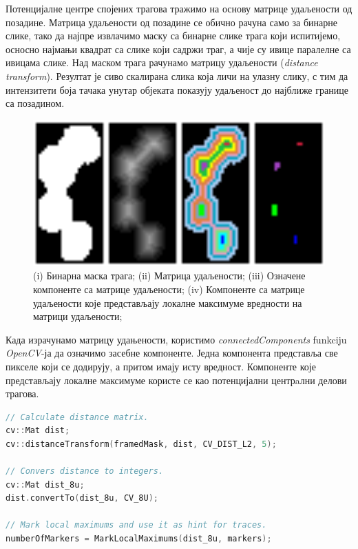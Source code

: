 \documentclass[12pt,a4paper,serbian,oneside]{book}
\begin{document}
Потенцијалне центре спојених трагова тражимо на основу матрице удаљености од позадине. Матрица удаљености од позадине се обично рачуна само за бинарне слике, тако да  најпре извлачимо маску са бинарне слике трага који испитијемо, осносно најмањи квадрат са слике који садржи траг, а чије су ивице паралелне са ивицама слике. Над маском трага рачунамо матрицу удаљености (\textit{distance transform}). Резултат је сиво скалирана слика која личи на улазну слику, с тим да интензитети боја тачака унутар објеката показују удаљеност до најближе границе са позадином.

\begin{figure}[htb]
\begin{center}
\includegraphics[width=150mm]{images/local_maxima.png}
\end{center}
\caption{(i) Бинарна маска трага; (ii) Матрица удаљености; (iii) Означене компоненте са матрице удаљености; (iv) Компоненте са матрице удаљености које представљају локалне максимуме вредности на матрици удаљености; }
\label{fig:local_maxima}
\end{figure}

Када израчунамо матрицу удањености, користимо \textit{connectedComponents} funkciju \textit{OpenCV}-ја да означимо засебне компоненте. Једна компонента представља све пикселе који се додирују, а притом имају исту вредност. Компоненте које представљају локалне максимуме користе се као потенцијални центрaлни делови трагова.

 \begin{lstlisting}[language=C++,label=lst:local_maxima,caption=Проналажење централних региона трагова]
// Calculate distance matrix.
cv::Mat dist;
cv::distanceTransform(framedMask, dist, CV_DIST_L2, 5);

// Convers distance to integers.
cv::Mat dist_8u;
dist.convertTo(dist_8u, CV_8U);

// Mark local maximums and use it as hint for traces.
numberOfMarkers = MarkLocalMaximums(dist_8u, markers);
\end{lstlisting}
\end{document}

